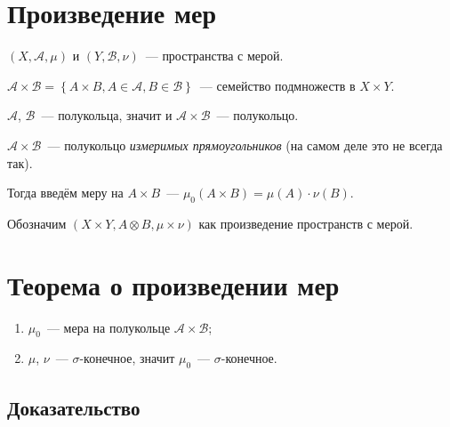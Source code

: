 \documentclass{article}
\begin{document}
\newpage

    \section{Произведение мер}
    
        $(X, \mathcal{A}, \mu)$ и $(Y, \mathcal{B}, \nu)$~--- пространства с мерой.
   
        $\mathcal{A} \times \mathcal{B} = \left\{ A \times B, A \in \mathcal{A}, B \in \mathcal{B} \right\}$~--- семейство подмножеств в $X \times Y$.
        
        $\mathcal{A}$, $\mathcal{B}$~--- полукольца, значит и $\mathcal{A} \times \mathcal{B}$~--- полукольцо.
                
        $\mathcal{A} \times \mathcal{B}$~--- полукольцо \textit{измеримых прямоугольников} (на самом деле это не всегда так).
            
            
        Тогда введём меру на $A \times B$~--- $\mu_0 (A \times B) = \mu(A) \cdot \nu(B)$.
        
        Обозначим $(X \times Y, A \otimes B, \mu \times \nu)$ как произведение пространств с мерой.
        
    \newpage
    
    \section{Теорема о произведении мер}
        
        \begin{enumerate}
        
            \item $\mu_0$~--- мера на полукольце $\mathcal{A} \times \mathcal{B}$;
            
            \item $\mu$, $\nu$~--- $\sigma$-конечное, значит $\mu_0$~--- $\sigma$-конечное.
            
        \end{enumerate}
        
        \subsection{Доказательство}
        
\end{document}
